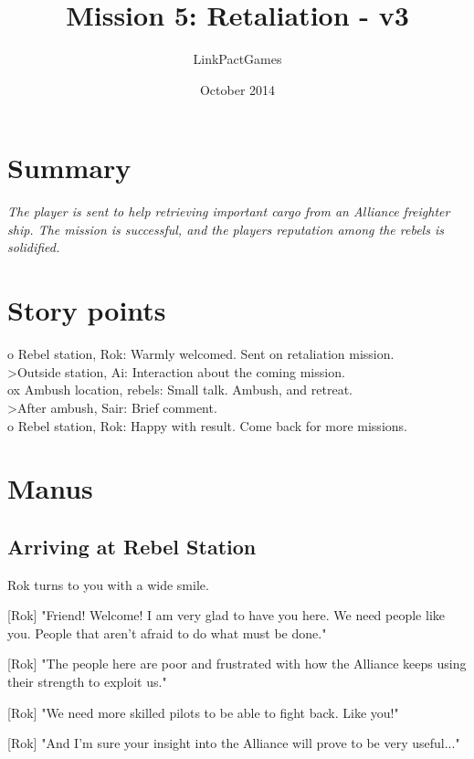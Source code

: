 \documentclass[a4paper,12pt]{article}
\begin{document}
\title{Mission 5: Retaliation - v3}
\author{LinkPactGames}
\date{October 2014}
\maketitle

\section{Summary}

\textit{The player is sent to help retrieving important cargo from an
Alliance freighter ship. The mission is successful, and the
players reputation among the rebels is solidified.}

\section{Story points}

o Rebel station, Rok: Warmly welcomed. Sent on retaliation mission.\\
\textgreater Outside station, Ai: Interaction about the coming mission.\\
ox Ambush location, rebels: Small talk. Ambush, and retreat.\\
\textgreater After ambush, Sair: Brief comment.\\
o Rebel station, Rok: Happy with result. Come back for more missions.\\

\section{Manus}

\subsection{Arriving at Rebel Station}

Rok turns to you with a wide smile. 

[Rok] "Friend! Welcome! I am very glad to have you here. We need people like you.
People that aren't afraid to do what must be done."

[Rok] "The people here are poor and frustrated with how the Alliance keeps using their strength
to exploit us." 

[Rok] "We need more skilled pilots to be able to fight back. Like you!" 

[Rok] "And I'm sure your insight into the Alliance will prove to be very useful..."
\end{document}

